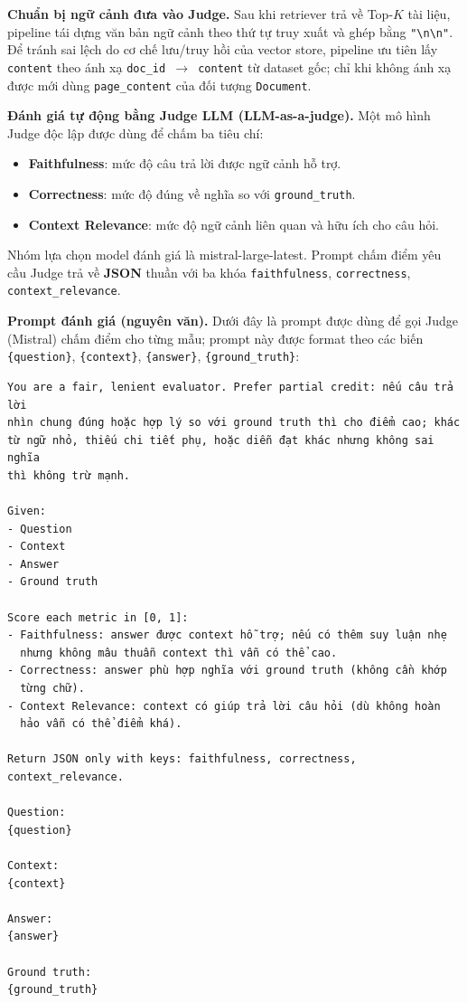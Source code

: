 \textbf{Chuẩn bị ngữ cảnh đưa vào Judge.} Sau khi retriever trả về Top-$K$ tài liệu, pipeline tái dựng văn bản ngữ cảnh theo thứ tự truy xuất và ghép bằng \texttt{"\textbackslash n\textbackslash n"}. Để tránh sai lệch do cơ chế lưu/truy hồi của vector store, pipeline ưu tiên lấy \texttt{content} theo ánh xạ \texttt{doc\_id $\rightarrow$ content} từ dataset gốc; chỉ khi không ánh xạ được mới dùng \texttt{page\_content} của đối tượng \texttt{Document}.

\textbf{Đánh giá tự động bằng Judge LLM (LLM-as-a-judge).} Một mô hình Judge độc lập được dùng để chấm ba tiêu chí:
\begin{itemize}
    \item \textbf{Faithfulness}: mức độ câu trả lời được ngữ cảnh hỗ trợ.
    \item \textbf{Correctness}: mức độ đúng về nghĩa so với \texttt{ground\_truth}.
    \item \textbf{Context Relevance}: mức độ ngữ cảnh liên quan và hữu ích cho câu hỏi.
\end{itemize}
Nhóm lựa chọn model đánh giá là mistral-large-latest. Prompt chấm điểm yêu cầu Judge trả về \textbf{JSON} thuần với ba khóa \texttt{faithfulness}, \texttt{correctness}, \texttt{context\_relevance}. 

\textbf{Prompt đánh giá (nguyên văn).} Dưới đây là prompt được dùng để gọi Judge (Mistral) chấm điểm cho từng mẫu; prompt này được format theo các biến \texttt{\{question\}}, \texttt{\{context\}}, \texttt{\{answer\}}, \texttt{\{ground\_truth\}}:

\begin{verbatim}
You are a fair, lenient evaluator. Prefer partial credit: nếu câu trả lời 
nhìn chung đúng hoặc hợp lý so với ground truth thì cho điểm cao; khác 
từ ngữ nhỏ, thiếu chi tiết phụ, hoặc diễn đạt khác nhưng không sai nghĩa 
thì không trừ mạnh.

Given:
- Question
- Context
- Answer
- Ground truth

Score each metric in [0, 1]:
- Faithfulness: answer được context hỗ trợ; nếu có thêm suy luận nhẹ 
  nhưng không mâu thuẫn context thì vẫn có thể cao.
- Correctness: answer phù hợp nghĩa với ground truth (không cần khớp 
  từng chữ).
- Context Relevance: context có giúp trả lời câu hỏi (dù không hoàn 
  hảo vẫn có thể điểm khá).

Return JSON only with keys: faithfulness, correctness, context_relevance.

Question:
{question}

Context:
{context}

Answer:
{answer}

Ground truth:
{ground_truth}
\end{verbatim}

